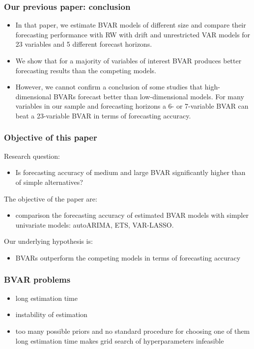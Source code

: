 \documentclass{beamer} %
\begin{document}
\begin{frame}
\frametitle{Our previous paper: conclusion}
\begin{itemize}
\item In that paper, we estimate BVAR models of different size and compare their forecasting performance with RW with drift and unrestricted VAR models for 23 variables and 5 different forecast horizons.
\item We show that for a majority of variables of interest BVAR produces better forecasting results than the competing models.
\item However, we cannot confirm a conclusion of some studies that high-dimensional BVARs forecast better than low-dimensional models. For many variables in our sample and forecasting horizons a 6- or 7-variable BVAR can beat a 23-variable BVAR in terms of forecasting accuracy.
\end{itemize}
\end{frame}

\begin{frame}
\frametitle{Objective of this paper}
Research question:
\begin{itemize}
\item Is forecasting accuracy of medium and large BVAR significantly higher than of simple  alternatives?
\end{itemize}
The objective of the paper are:
\begin{itemize}
\item comparison the forecasting accuracy of estimated BVAR models with simpler univariate models: autoARIMA, ETS, VAR-LASSO.
\end{itemize}
Our underlying hypothesis is:
\begin{itemize}
\item BVARs outperform the competing models in terms of forecasting accuracy
\end{itemize}
\end{frame}

\begin{frame}
\frametitle{BVAR problems}
\begin{itemize}
\item long estimation time
\item instability of estimation
\item too many possible priors and no standard procedure for choosing one of them
long estimation time makes grid search of hyperparameters infeasible
\end{itemize}
\end{frame}
\end{document}
